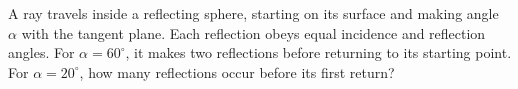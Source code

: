 A ray travels inside a reflecting sphere, starting on its surface and making angle $\alpha$ with the tangent plane. Each reflection obeys equal incidence and reflection angles. For $\alpha=60^\circ$, it makes two reflections before returning to its starting point. For $\alpha=20^\circ$, how many reflections occur before its first return?
